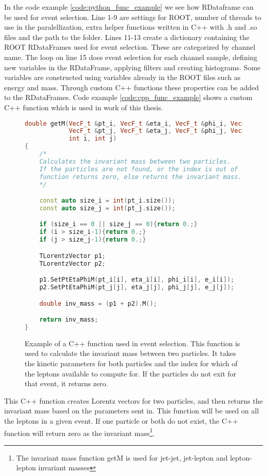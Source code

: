 In the code example \ref{code:python_func_example} we see how RDataframe can be used for event selection. Line 1-9 are settings for ROOT, 
number of threads to use in the paralellization, extra helper functions written in C++ with .h and .so files and the path to the folder.
Lines 11-13 create a dictionary containing the ROOT RDataFrames used for event selection. These are categorized by channel name. 
The loop on line 15 does event selection for each channel sample, defining new variables in the RDataFrame, applying filters and creating histograms.
Some variables are constructed using variables already in the ROOT files such as energy and mass. Through custom C++ functions
these properties can be added to the RDataFrames. Code example \ref{code:cpp_func_example} shows a custom C++ function which is used in work of this thesis.

\begin{figure}[h!]
    \centering
\begin{lstlisting}[language=C++, style=cppstyle, label={code:cpp_func_example}]
double getM(VecF_t &pt_i, VecF_t &eta_i, VecF_t &phi_i, VecF_t &e_i,
            VecF_t &pt_j, VecF_t &eta_j, VecF_t &phi_j, VecF_t &e_j,
            int i, int j)
{
    /* 
    Calculates the invariant mass between two particles.
    If the particles are not found, or the index is out of range,
    function returns zero, else returns the invariant mass.
    */

    const auto size_i = int(pt_i.size());
    const auto size_j = int(pt_j.size());

    if (size_i == 0 || size_j == 0){return 0.;}
    if (i > size_i-1){return 0.;}
    if (j > size_j-1){return 0.;}

    TLorentzVector p1;
    TLorentzVector p2;

    p1.SetPtEtaPhiM(pt_i[i], eta_i[i], phi_i[i], e_i[i]);
    p2.SetPtEtaPhiM(pt_j[j], eta_j[j], phi_j[j], e_j[j]);

    double inv_mass = (p1 + p2).M();

    return inv_mass;
}
\end{lstlisting}
\caption[C++ function example]{Example of a C++ function used in event selection. This function is used to calculate the invariant mass between two particles.
It takes the kinetic parameters for both particles and the index for which of the leptons available to compute for. If the particles do not exit for that event, it returns zero.  }
\end{figure}
This C++ function creates Lorentz vectors for two particles, and then returns the invariant mass based on the parameters sent in. 
This function will be used on all the leptons in a given event. If one particle or both do not exist, the C++ function will
return zero as the invariant mass\footnote{The invariant mass function getM is used for jet-jet, jet-lepton and lepton-lepton invariant masses}. \par


